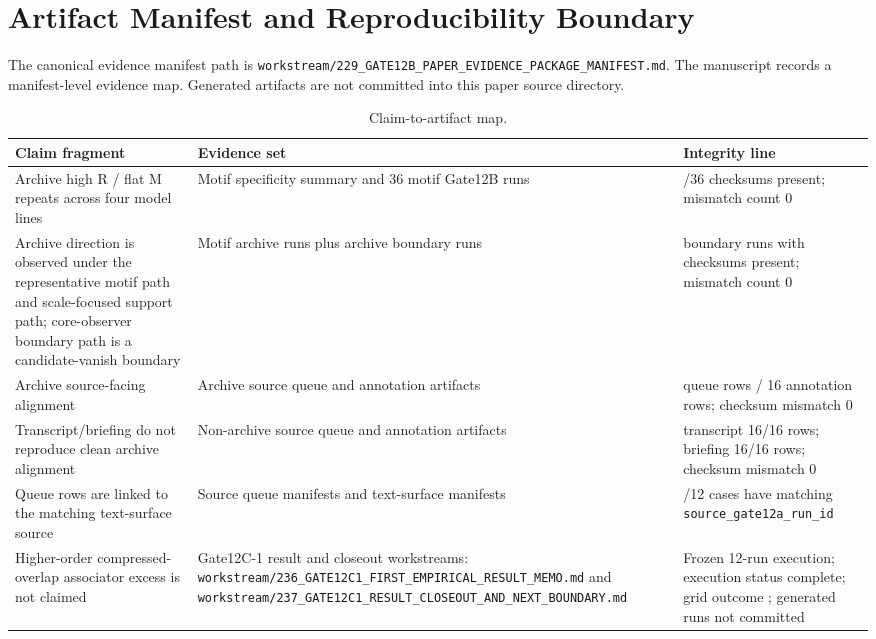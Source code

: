 \documentclass[11pt]{article}
\newcommand{\code}[1]{\texttt{\detokenize{#1}}}
\newcommand{\breakcode}[1]{\begingroup\urlstyle{tt}\nolinkurl{#1}\endgroup}
\begin{document}
\section{Artifact Manifest and Reproducibility Boundary}
\label{sec:manifest}

The canonical evidence manifest path is
\breakcode{workstream/229_GATE12B_PAPER_EVIDENCE_PACKAGE_MANIFEST.md}. The
manuscript records a manifest-level evidence map. Generated \code{runs/}
artifacts are not committed into this paper source directory.

\begin{table}[ht]
\centering
\small
\caption{Claim-to-artifact map.}
\label{tab:claim-artifacts}
\begin{tabular}{|>{\raggedright\arraybackslash}p{}|>{\raggedright\arraybackslash}p{}|>{\raggedright\arraybackslash}p{}|}
\hline
Claim fragment & Evidence set & Integrity line \\
\hline
Archive high R / flat M repeats across four model lines & Motif specificity summary and 36 motif Gate12B runs & 36/36 checksums present; mismatch count 0 \\
\hline
Archive direction is observed under the representative motif path and scale-focused support path; core-observer boundary path is a candidate-vanish boundary & Motif archive runs plus archive boundary runs & 24 boundary runs with checksums present; mismatch count 0 \\
\hline
Archive source-facing alignment & Archive source queue and annotation artifacts & 16 queue rows / 16 annotation rows; checksum mismatch 0 \\
\hline
Transcript/briefing do not reproduce clean archive alignment & Non-archive source queue and annotation artifacts & transcript 16/16 rows; briefing 16/16 rows; checksum mismatch 0 \\
\hline
Queue rows are linked to the matching text-surface source & Source queue manifests and text-surface manifests & 12/12 cases have matching \breakcode{source_gate12a_run_id} \\
\hline
Higher-order compressed-overlap associator excess is not claimed &
Gate12C-1 result and closeout workstreams:
\breakcode{workstream/236_GATE12C1_FIRST_EMPIRICAL_RESULT_MEMO.md} and
\breakcode{workstream/237_GATE12C1_RESULT_CLOSEOUT_AND_NEXT_BOUNDARY.md} &
Frozen 12-run execution; execution status complete; grid outcome
\code{no_directional_support}; generated runs not committed \\
\hline
\end{tabular}
\end{table}
\end{document}
